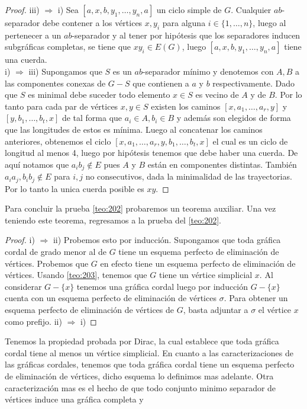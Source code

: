 \begin{proof}
    iii) $\Rightarrow$ i)
    Sea $[a,x,b, y_1, \dots, y_n, a]$ un ciclo simple de $G$. Cualquier $ab$-separador debe contener a los vértices $x,y_i$ para alguna $i\in \{1, \dots, n \}$, luego al pertenecer a un $ab$-separador y al tener por hipótesis que los separadores inducen subgráficas completas, se tiene que $xy_i \in E(G)$, luego $[a,x,b, y_1, \dots, y_n, a]$ tiene una cuerda.\\
    
    i) $\Rightarrow$ iii) 
    Supongamos que $S$ es un $ab$-separador mínimo y denotemos con $A,B$ a las componentes conexas de $G-S$ que contienen a $a$ y $b$ respectivamente. Dado que $S$ es minimal debe suceder todo elemento $x\in S$ es vecino de $A$ y de $B$. Por lo tanto para cada par de vértices $x,y\in S$ existen los caminos $[x,a_1, \dots, a_r,y]$ y $[y,b_1,\dots, b_t,x]$ de tal forma que $a_i\in A, b_i\in B$ y además son elegidos de forma que las longitudes de estos es mínima. Luego al concatenar los caminos anteriores, obtenemos el ciclo $[x,a_1, \dots, a_r,y,b_1,\dots, b_t,x]$ el cual es un ciclo de longitud al menos 4, luego por hipótesis tenemos que debe haber una cuerda. De aquí notamos que $a_ib_j\notin E$ pues $A$ y $B$ están en componentes distintas. También $a_ia_j, b_ib_j \notin E$ para $i,j$ no consecutivos, dada la minimalidad de las trayectorias. Por lo tanto la unica cuerda posible es $xy$.
    
\end{proof}

Para concluir la prueba \cref{teo:202} probaremos un teorema auxiliar.
Una vez teniendo este teorema, regresamos a la prueba del \cref{teo:202}. 
\begin{proof}
    i) $\Rightarrow$ ii) 
    Probemos esto por inducción. Supongamos que toda gráfica cordal de grado menor al de $G$ tiene un esquema perfecto de eliminación de vértices. Probemos que $G$ en efecto tiene un esquema perfecto de eliminación de vértices. Usando \cref{teo:203}, tenemos que $G$ tiene un vértice simplicial $x$. Al considerar $G-\{x\}$ tenemos una gráfica cordal luego por inducción $G-\{x\}$ cuenta con un esquema perfecto de eliminación de vértices $\sigma $. Para obtener un esquema perfecto de eliminación de vértices de $G$, basta adjuntar a $\sigma$ el vértice $x$ como prefijo.
    ii) $\Rightarrow$ i) 
    
\end{proof}

Tenemos la propiedad probada por Dirac, la cual establece que toda gráfica cordal tiene al menos un vértice simplicial. En cuanto a las caracterizaciones de las gráficas cordales, tenemos que toda gráfica cordal tiene un esquema perfecto de eliminación de vértices, dicho esquema lo definimos mas adelante. Otra caracterización mas es el hecho de que todo conjunto minimo separador de vértices induce una gráfica completa y 



